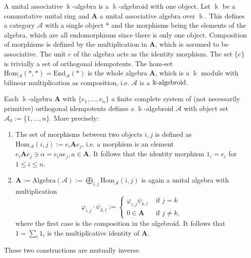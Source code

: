 A unital associative $\Bbbk$-algebra is a $\Bbbk$-algebroid with one object.
Let $\Bbbk$ be a commutative unital ring and $\mathbf{A}$ a unital associative algebra over $\Bbbk$. This defines a category $\mathcal{A}$
with a single object $\ast$ and the morphisms being the elements of the algebra, which are all endomorphisms since there is only one object.
Composition of morphisms is defined by the multiplication in $\mathbf{A}$, which is assumed to be associative.
The unit $e$ of the algebra acts as the identity morphism. The set $\{ e \}$ is trivially a set of orthogonal idempotents.
The hom-set $\mathrm{Hom}_{\mathcal{A}}(\ast,\ast) = \mathrm{End}_{\mathcal{A}}(\ast)$ is the whole algebra $\mathbf{A}$, which is
a $\Bbbk$ module with bilinear multiplication as composition, i.e. $\mathcal{A}$ is a $\Bbbk\textnormal{-}\mathrm{algebroid}$.

\begin{proposition}\label{prop:Alg-Alg-Correspondence}
Each $\Bbbk$-algebra $\mathbf{A}$ with $\{e_{1},\dots,e_{n}\}$ a finite complete system of (not necessarily primitive) orthogonal
idempotents defines a $\Bbbk$-algebroid $\mathcal{A}$ with object set $\mathcal{A}_{0} := \{1,\dots,n\}$. More precisely:
\begin{enumerate}
\renewcommand{\labelenumi}{(\theenumi)}
\item The set of morphisms between two objects $i,j$ is defined as
$\mathrm{Hom}_{\mathcal{A}}(i,j) := e_{i}\mathbf{A}e_{j}$, i.e. a morphism is an element
$e_{i}\mathbf{A}e_{j} \ni \alpha = e_{i}ae_{j}, a\in \mathbf{A}$.
It follows that the identity morphism $1_{i} = e_{i}$ for $1\leq i \leq n$.

\item $\mathbf{A} := \mathrm{Algebra}(\mathcal{A}) := \bigoplus_{i,j} \mathrm{Hom}_{\mathcal{A}}(i,j)$ is again a unital algebra with
multiplication 
\[
\varphi_{i,j} \cdot \psi_{k,l} := \begin{cases}\varphi_{i,j} \psi_{k,l} & \text{ if } j = k\\
0 \in \mathbf{A} & \text{ if } j \neq k, \end{cases}
\]
where the first case is the composition in the algebroid. It follows that $1 = \sum_{i} 1_{i}$ is the multiplicative identity of $\mathbf{A}$.

\end{enumerate}
These two constructions are mutually inverse.
\end{proposition}
